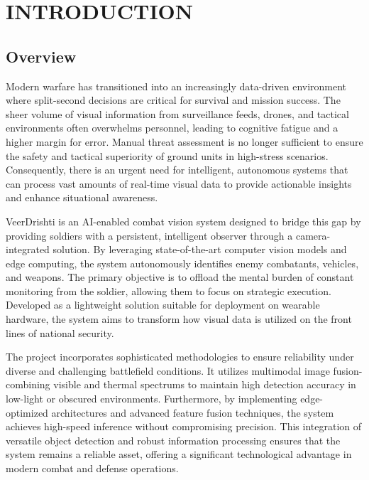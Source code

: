 \chapter{INTRODUCTION}

\section{Overview}
Modern warfare has transitioned into an increasingly data-driven environment where split-second decisions are critical for survival and mission success. The sheer volume of visual information from surveillance feeds, drones, and tactical environments often overwhelms personnel, leading to cognitive fatigue and a higher margin for error. Manual threat assessment is no longer sufficient to ensure the safety and tactical superiority of ground units in high-stress scenarios. Consequently, there is an urgent need for intelligent, autonomous systems that can process vast amounts of real-time visual data to provide actionable insights and enhance situational awareness. \vspace{6pt}

\hspace{3em} VeerDrishti is an AI-enabled combat vision system designed to bridge this gap by providing soldiers with a persistent, intelligent observer through a camera-integrated solution. By leveraging state-of-the-art computer vision models and edge computing, the system autonomously identifies enemy combatants, vehicles, and weapons. The primary objective is to offload the mental burden of constant monitoring from the soldier, allowing them to focus on strategic execution. Developed as a lightweight solution suitable for deployment on wearable hardware, the system aims to transform how visual data is utilized on the front lines of national security. \vspace{6pt}

\hspace{3em} The project incorporates sophisticated methodologies to ensure reliability under diverse and challenging battlefield conditions. It utilizes multimodal image fusion-combining visible and thermal spectrums to maintain high detection accuracy in low-light or obscured environments. Furthermore, by implementing edge-optimized architectures and advanced feature fusion techniques, the system achieves high-speed inference without compromising precision. This integration of versatile object detection and robust information processing ensures that the system remains a reliable asset, offering a significant technological advantage in modern combat and defense operations.

